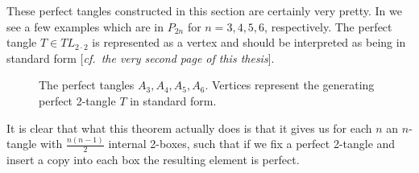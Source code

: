 These perfect tangles constructed in this section are certainly very pretty. In  we see a few examples which are in $P_{2n}$ for $n=3,4,5,6$, respectively. The perfect tangle $T\in TL_{2\cdot 2}$ is represented as a vertex and should be interpreted as being in standard form [\emph{cf.\ the very second page of this thesis}].
\begin{figure}[!htp]\centering
\captionsetup{width=.7\linewidth}
\caption[Examples of perfect tangles obtained by the iterative construction proved in \textsf{Theorem \ref{thm:general_existence}}]{The perfect tangles $A_3,A_4,A_5,A_6$. Vertices represent the generating perfect 2-tangle $T$ in standard form.}
\label{fig:examples_general_construction}
\end{figure}


It is clear that what this theorem actually does is that it gives us for each $n$ an $n$-tangle with $\frac{n(n-1)}{2}$ internal 2-boxes, such that if we fix a perfect 2-tangle and insert a copy into each box the resulting element is perfect.


